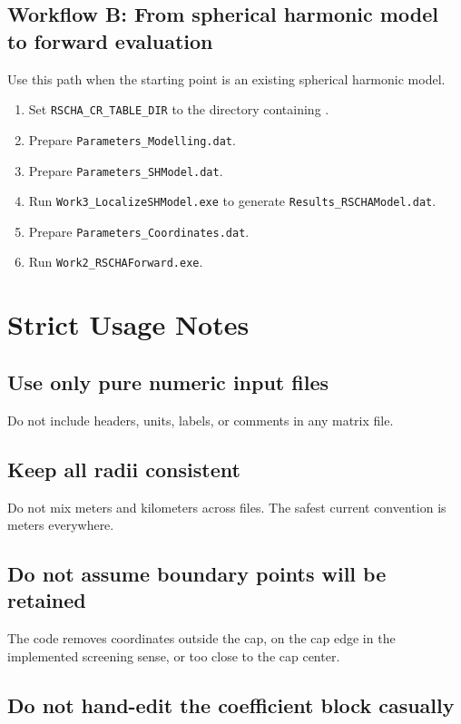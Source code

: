 \documentclass[11pt,a4paper]{article}
\begin{document}
\subsection{Workflow B: From spherical harmonic model to forward evaluation}

Use this path when the starting point is an existing spherical harmonic model.

\begin{enumerate}
  \item Set \texttt{RSCHA\_CR\_TABLE\_DIR} to the directory containing .
  \item Prepare \texttt{Parameters\_Modelling.dat}.
  \item Prepare \texttt{Parameters\_SHModel.dat}.
  \item Run \texttt{Work3\_LocalizeSHModel.exe} to generate \texttt{Results\_RSCHAModel.dat}.
  \item Prepare \texttt{Parameters\_Coordinates.dat}.
  \item Run \texttt{Work2\_RSCHAForward.exe}.
\end{enumerate}

\section{Strict Usage Notes}

\subsection{Use only pure numeric input files}

Do not include headers, units, labels, or comments in any matrix file.

\subsection{Keep all radii consistent}

Do not mix meters and kilometers across files. The safest current convention is meters everywhere.

\subsection{Do not assume boundary points will be retained}

The code removes coordinates outside the cap, on the cap edge in the implemented screening sense, or too close to the cap center.

\subsection{Do not hand-edit the coefficient block casually}
\end{document}
